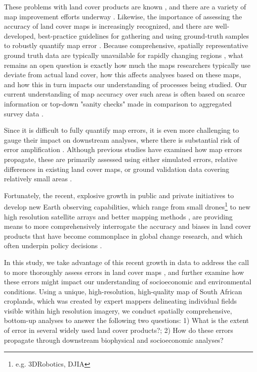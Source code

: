 \documentclass[a4paper]{article}
\begin{document}
These problems with land cover products are known \citep{fritz_comparison_2010, fritz_cropland_2011, see_improved_2015, fritz_mapping_2015,verburg_challenges_2011}, and there are a variety of map improvement efforts underway \citep[e.g.][]{fritz_geo-wiki:_2012, estes_platform_2016}. Likewise, the importance of assessing the accuracy of land cover maps is increasingly recognized, and there are well-developed, best-practice guidelines for gathering and using ground-truth samples to robustly quantify map error \citep{foody_status_2002,olofsson_making_2013,olofsson_good_2014,stehman_global_2012}. Because comprehensive, spatially representative ground truth data are typically unavailable for rapidly changing regions \citep{see_improved_2015,kuemmerle_challenges_2013}, what remains an open question is exactly how much the maps researchers typically use deviate from actual land cover, how this affects analyses based on these maps, and how this in turn impacts our understanding of processes being studied.  Our current understanding of map accuracy over such areas is often based on scarce information or top-down "sanity checks" made in comparison to aggregated survey data \citep{yu_meta-discoveries_2014,larsen_taken_2015}.  

Since it is difficult to fully quantify map errors, it is even more challenging to gauge their impact on downstream analyses, where there is substantial risk of error amplification \citep{kuemmerle_challenges_2013}. Although previous studies have examined how map errors propagate, these are primarily assessed using either simulated errors, relative differences in existing land cover maps, or ground validation data covering relatively small areas \citep[e.g.][]{ge_impacts_2007, linard_assessing_2010, quaife_impact_2008, tuanmu_global_2014, schmit_limitations_2006}. 

Fortunately, the recent, explosive growth in public and private initiatives to develop new Earth observing capabilities, which range from small drones\footnote{e.g. 3DRobotics, DJIA} to new high resolution satellite arrays \citep{drusch_sentinel-2:_2012,hand_startup_2015} and better mapping methods \citep{fritz_geo-wiki:_2012,estes_projected_2013,debats_generalized_2016}, are providing means to more comprehensively interrogate the accuracy and biases in land cover products that have become commonplace in global change research, and which often underpin policy decisions \citep{searchinger_high_2015}.  

In this study, we take advantage of this recent growth in data to address the call to more thoroughly assess errors in land cover maps \citep{kuemmerle_challenges_2013, olofsson_good_2014,olofsson_global_2012}, and further examine how these errors might impact our understanding of socioeconomic and environmental conditions. Using a unique, high-resolution, high-quality map of South African croplands, which was created by expert mappers delineating individual fields visible within high resolution imagery, we conduct spatially comprehensive, bottom-up analyses to answer the following two questions: 1) What is the extent of error in several widely used land cover products?; 2) How do these errors propagate through downstream biophysical and socioeconomic analyses? 
\end{document}
